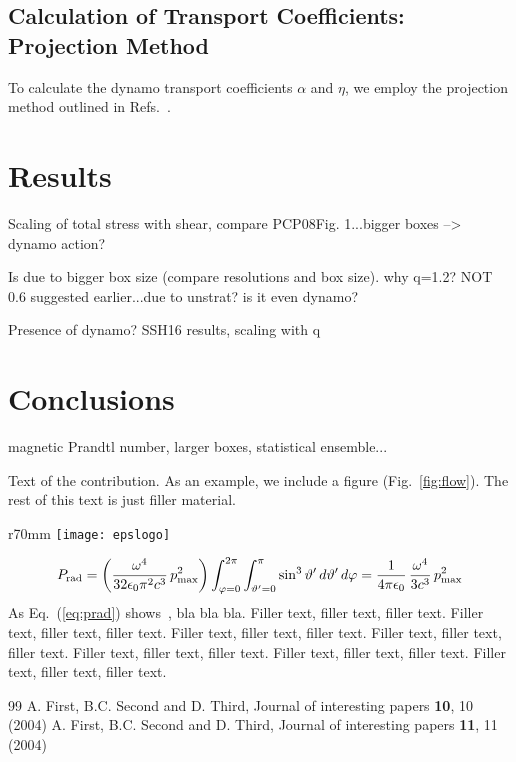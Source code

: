\documentclass{epsconf}
\begin{document}
\subsection{Calculation of Transport Coefficients: Projection Method}
To calculate the dynamo transport coefficients $\alpha$ and $\eta$, we employ the projection method outlined in Refs.~\cite{BS02, SB16}.

\section{Results}
Scaling of total stress with shear, compare PCP08Fig. 1...bigger boxes --> dynamo action?

Is due to bigger box size (compare resolutions  and box size).
why q=1.2? NOT 0.6 suggested earlier...due to unstrat? is it even dynamo?

Presence of dynamo? SSH16 results, scaling with q


\section{Conclusions}
magnetic Prandtl number, larger boxes, statistical ensemble...


Text of the contribution. As an example, we include a figure (Fig.~\ref{fig:flow}). The rest of
this text is just filler material.

\begin{wrapfigure}{r}{70mm}\centering
\vspace{0cm} %
\texttt{[image: epslogo]}
\caption{\it \small EPS logo}
\label{fig:flow}
\vspace{0cm} %
\end{wrapfigure}

\begin{equation}
\label{eq:prad}
    P_{\text{\scriptsize rad}} =
    \left( \frac{\omega^4}{32 \epsilon_0 \pi^2 c^3}\,p_{\text{\scriptsize max}}^2 \right)
    \int_{\varphi=0}^{2\pi} \int_{\vartheta'=0}^{\pi} \sin^3\vartheta'\,d\vartheta'\,d\varphi
    = \frac{1}{4\pi\epsilon_0}\,\frac{\omega^4}{3 c^3}\,p_{\text{\scriptsize max}}^2
\end{equation}
As Eq.~(\ref{eq:prad}) shows~\cite{Interestingpaper}, bla bla bla.
Filler text, filler text, filler text.
Filler text, filler text, filler text.
Filler text, filler text, filler text.
Filler text, filler text, filler text.
Filler text, filler text, filler text.
Filler text, filler text, filler text.
Filler text, filler text, filler text.

\begin{thebibliography}{99}
A. First, B.C. Second and D. Third, Journal of interesting papers {\bf 10}, 10 (2004)
A. First, B.C. Second and D. Third, Journal of interesting papers {\bf 11}, 11 (2004)
\end{thebibliography}
\end{document}

